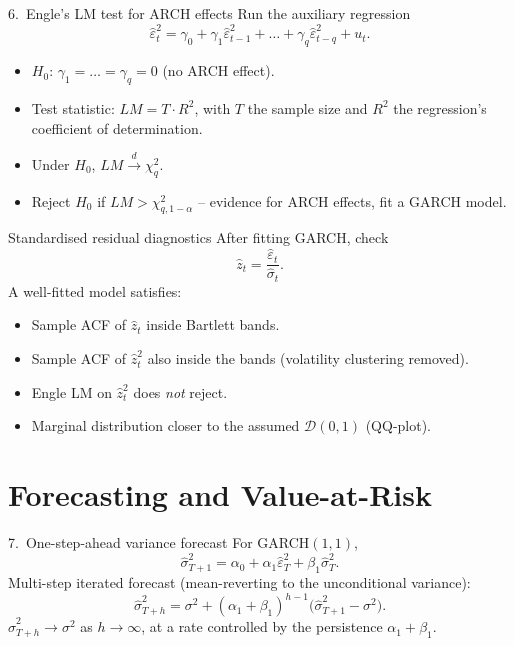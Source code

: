 \documentclass[aspectratio=169]{beamer}
\begin{document}
\begin{frame}{6.~Engle's LM test for ARCH effects}
  Run the auxiliary regression
  \[
    \widehat\varepsilon_t^2
    = \gamma_0 + \gamma_1 \widehat\varepsilon_{t-1}^2
              + \dots + \gamma_q \widehat\varepsilon_{t-q}^2 + u_t.
  \]
  \begin{itemize}
    \item $H_0$: $\gamma_1 = \dots = \gamma_q = 0$ (no ARCH effect).
    \item Test statistic: $LM = T \cdot R^2$, with $T$ the sample
          size and $R^2$ the regression's coefficient of
          determination.
    \item Under $H_0$, $LM \xrightarrow{d} \chi^2_q$.
    \item Reject $H_0$ if $LM > \chi^2_{q, 1 - \alpha}$ -- evidence
          for ARCH effects, fit a GARCH model.
  \end{itemize}
\end{frame}

\begin{frame}{Standardised residual diagnostics}
  After fitting GARCH, check
  \[
    \widehat z_t = \frac{\widehat\varepsilon_t}{\widehat\sigma_t}.
  \]
  A well-fitted model satisfies:
  \begin{itemize}
    \item Sample ACF of $\widehat z_t$ inside Bartlett bands.
    \item Sample ACF of $\widehat z_t^2$ also inside the bands
          (volatility clustering removed).
    \item Engle LM on $\widehat z_t^2$ does \emph{not} reject.
    \item Marginal distribution closer to the assumed
          $\mathcal D(0, 1)$ (QQ-plot).
  \end{itemize}
\end{frame}

\section{Forecasting and Value-at-Risk}

\begin{frame}{7.~One-step-ahead variance forecast}
  For GARCH$(1, 1)$,
  \[
    \widehat\sigma_{T+1}^2
    = \alpha_0 + \alpha_1 \widehat\varepsilon_T^2
               + \beta_1 \widehat\sigma_T^2.
  \]
  Multi-step iterated forecast (mean-reverting to the
  unconditional variance):
  \[
    \widehat\sigma_{T+h}^2
    = \sigma^2
    + (\alpha_1 + \beta_1)^{h - 1}
        \bigl(\widehat\sigma_{T+1}^2 - \sigma^2\bigr).
  \]
  \pause
  $\widehat\sigma_{T+h}^2 \to \sigma^2$ as $h \to \infty$, at a rate
  controlled by the persistence $\alpha_1 + \beta_1$.
\end{frame}
\end{document}
